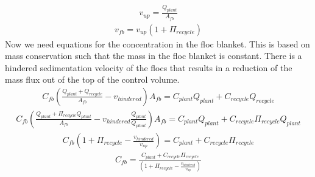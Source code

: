\documentclass[letterpaper,10pt,english]{sphinxmanual}
\begin{document}
\begin{equation}\label{equation:Sedimentation/Sed_Theory_and_Future_Work:Sedimentation/Sed_Theory_and_Future_Work:4}
\begin{split}v_{up} = \frac{Q_{plant}}{A_{fb}}\end{split}
\end{equation}\begin{equation}\label{equation:Sedimentation/Sed_Theory_and_Future_Work:Sedimentation/Sed_Theory_and_Future_Work:5}
\begin{split}v_{fb} = v_{up}\left( 1 + \Pi_{recycle} \right)\end{split}
\end{equation}
Now we need equations for the concentration in the floc blanket. This is based on mass conservation such that the mass in the floc blanket is constant. There is a hindered sedimentation velocity of the flocs that results in a reduction of the mass flux out of the top of the control volume.
\begin{equation}\label{equation:Sedimentation/Sed_Theory_and_Future_Work:Sedimentation/Sed_Theory_and_Future_Work:6}
\begin{split}C_{fb}\left(\frac{ Q_{plant}+Q_{recycle} }{A_{fb}}-v_{hindered}\right) A_{fb}= C_{plant}Q_{plant} + C_{recycle}Q_{recycle}\end{split}
\end{equation}\begin{equation}\label{equation:Sedimentation/Sed_Theory_and_Future_Work:Sedimentation/Sed_Theory_and_Future_Work:7}
\begin{split}C_{fb}\left(\frac{ Q_{plant}+\Pi_{recycle}Q_{plant} }{A_{fb}}-v_{hindered}\frac{Q_{plant}}{Q_{plant}}\right) A_{fb}= C_{plant}Q_{plant} + C_{recycle}\Pi_{recycle}Q_{plant}\end{split}
\end{equation}\begin{equation}\label{equation:Sedimentation/Sed_Theory_and_Future_Work:Sedimentation/Sed_Theory_and_Future_Work:8}
\begin{split}C_{fb}\left( 1+\Pi_{recycle} -\frac{v_{hindered}}{v_{up}}\right) = C_{plant} + C_{recycle}\Pi_{recycle}\end{split}
\end{equation}\begin{equation}\label{equation:Sedimentation/Sed_Theory_and_Future_Work:Sedimentation/Sed_Theory_and_Future_Work:9}
\begin{split}C_{fb} = \frac{C_{plant} + C_{recycle}\Pi_{recycle}}{\left(1+\Pi_{recycle}-\frac{v_{hindered}}{v_{up}}\right)}\end{split}
\end{equation}
\end{document}
